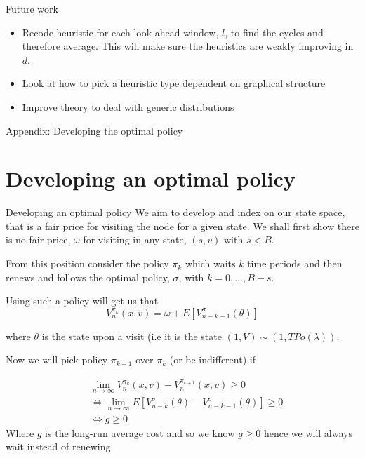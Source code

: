 \documentclass[10pt]{beamer}
\begin{document}
\begin{frame}{Future work}
\begin{itemize}
\item Recode heuristic for each look-ahead window, $l$, to find the cycles and therefore average. This will make sure the heuristics are weakly improving in $d$.
\item Look at how to pick a heuristic type dependent on graphical structure
\item Improve theory to deal with generic distributions
\end{itemize}
\end{frame}

\begin{frame}
\end{frame}

\begin{frame}

\end{frame}


\begin{frame}

\begin{center}
\Huge Appendix: Developing the optimal policy
\end{center}

\end{frame}

\section{Developing an optimal policy}
\begin{frame}{Developing an optimal policy}
We aim to develop and index on our state space, that is a fair price for visiting the node for a given state. We shall first show there is no fair price, $\omega$ for visiting in any state, $(s,v)$ with $s < B$.

From this position consider the policy $\pi_{k}$ which waits $k$ time periods and then renews and follows the optimal policy, $\sigma$, with $k=0,...,B-s$.

Using such a policy will get us that
\begin{equation}
V_{n}^{\pi_{k}}(x,v)=\omega + E[V_{n-k-1}^{\sigma}(\theta)]
\end{equation}

where $\theta$ is the state upon a visit (i.e it is the state $(1,V) \sim (1,TPo(\lambda))$.

Now we will pick policy $\pi_{k+1}$ over $\pi_{k}$ (or be indifferent) if

\begin{align*}
&\lim\limits_{n \rightarrow \infty} V_{n}^{\pi_{k}} (x,v) - V_{n}^{\pi_{k+1}}(x,v) \geq 0 \\
& \iff \lim\limits_{n \rightarrow \infty} E[V_{n-k}^{\sigma}(\theta) - V_{n-k-1}^{\sigma} (\theta)] \geq 0 \\
& \iff g \geq 0
\end{align*}
Where $g$ is the long-run average cost and so we know $g \geq 0$ hence we will always wait instead of renewing.
\end{frame}
\end{document}

